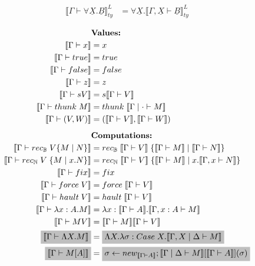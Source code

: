 \documentclass[acmsmall]{acmart}
\newcommand{\den}[1]{\llbracket #1\rrbracket}
\newcommand{\denLty}[1]{\den{#1}^L_{ty}}
\begin{document}
\begin{figure}[H]
\begin{minipage}[t]{0.48\textwidth}
\[\begin{aligned}
      \denLty{\Gamma \vdash \forall \underline{X}. \underline{B}} &= \forall \underline{X}. \denLty{\Gamma,\underline{X} \vdash \underline{B}}
    \end{aligned}
    \]
  \end{minipage}\hspace{2em}%
  \begin{minipage}[t]{0.48\textwidth}
    \[
    \begin{aligned}
      &\textbf{Values:} \\
      \den{\Gamma \vdash x} &= x \\
      \den{\Gamma \vdash true} &= true \\
      \den{\Gamma \vdash false} &= false \\
      \den{\Gamma \vdash z} &= z \\
      \den{\Gamma \vdash s V} &= s \den{\Gamma \vdash V} \\
      \den{\Gamma \vdash thunk\;M} &= thunk \; \den{\Gamma \;|\; \cdot \vdash M} \\
      \den{\Gamma \vdash (V,W)} &= (\den{\Gamma \vdash V}, \den{\Gamma \vdash W}) \\[0.5em]
      &\textbf{Computations:} \\
      \den{\Gamma \vdash rec_{\mathbb{B}}\;V \{M\;|\;N\}} &= rec_{\mathbb{B}}\;\den{\Gamma \vdash V} \;\{\den{\Gamma \vdash M}\;|\;\den{\Gamma \vdash N}\} \\
      \den{\Gamma \vdash rec_{\mathbb{N}}\;V\;\{M \;|\; x. N\}} &= rec_{\mathbb{N}}\;\den{\Gamma \vdash V} \;\{\den{\Gamma \vdash M}\;|\;x. \den{\Gamma, x \vdash N}\} \\
      \den{\Gamma \vdash fix} &= fix \\
      \den{\Gamma \vdash force \;V} &= force\;\den{\Gamma \vdash V} \\
      \den{\Gamma \vdash hault\;V} &= hault\;\den{\Gamma \vdash V} \\
      \den{\Gamma \vdash \lambda x :A. M} &= \lambda x:\den{\Gamma \vdash A}. \den{\Gamma, x : A \vdash M} \\
      \den{\Gamma \vdash MV} &= \den{\Gamma \vdash M}\den{\Gamma \vdash V} \\
      \colorbox{lightgray}{$\den{\Gamma \vdash \Lambda X. M}$} &= \colorbox{lightgray}{$\Lambda X. \lambda \sigma : Case\;X. \den{\Gamma,X \;|\;\Delta \vdash M}$} \\
      \colorbox{lightgray}{$\den{\Gamma \vdash M[A]}$} &= \colorbox{lightgray}{$\sigma \leftarrow new_{\den{\Gamma \vdash A}}; \den{\Gamma \;|\;\Delta \vdash M}[\den{\Gamma \vdash A}](\sigma)$} \\

\end{aligned}\]
\end{minipage}
\end{figure}
\end{document}
